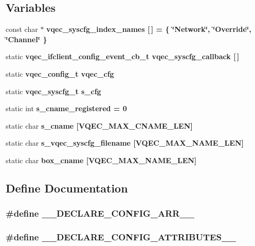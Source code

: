\subsection*{Variables}
\begin{CompactItemize}
\item 
const char $\ast$ \bf{vqec\_\-syscfg\_\-index\_\-names} [$\,$] = \{ \char`\"{}Network\char`\"{}, \char`\"{}Override\char`\"{}, \char`\"{}Channel\char`\"{} \}
\item 
static \bf{vqec\_\-ifclient\_\-config\_\-event\_\-cb\_\-t} \bf{vqec\_\-syscfg\_\-callback} [$\,$]
\item 
static \bf{vqec\_\-config\_\-t} \bf{vqec\_\-cfg}
\item 
static \bf{vqec\_\-syscfg\_\-t} \bf{s\_\-cfg}
\item 
static int \bf{s\_\-cname\_\-registered} = 0
\item 
static char \bf{s\_\-cname} [VQEC\_\-MAX\_\-CNAME\_\-LEN]
\item 
static char \bf{s\_\-vqec\_\-syscfg\_\-filename} [VQEC\_\-MAX\_\-NAME\_\-LEN]
\item 
static char \bf{box\_\-cname} [VQEC\_\-MAX\_\-NAME\_\-LEN]
\end{CompactItemize}


\subsection{Define Documentation}
\subsubsection{\setlength{\rightskip}{0pt plus 5cm}\#define \_\-\_\-DECLARE\_\-CONFIG\_\-ARR\_\-\_\-}\label{vqec__syscfg_8c_ea338e0ce04e2dc259cb6c37594370b3}


\subsubsection{\setlength{\rightskip}{0pt plus 5cm}\#define \_\-\_\-DECLARE\_\-CONFIG\_\-ATTRIBUTES\_\-\_\-}\label{vqec__syscfg_8c_06ee26cd0e8095ca5c846edefb798a3e}



